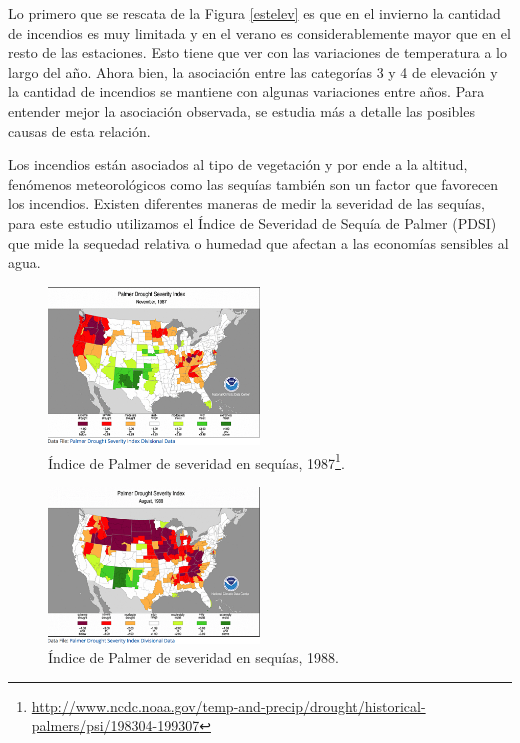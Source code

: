 \documentclass[12,]{article}
\let\rmarkdownfootnote\footnote%
\def\footnote{\protect\rmarkdownfootnote}
\begin{document}
Lo primero que se rescata de la Figura \ref{estelev} es que en el
invierno la cantidad de incendios es muy limitada y en el verano es
considerablemente mayor que en el resto de las estaciones. Esto tiene
que ver con las variaciones de temperatura a lo largo del año. Ahora
bien, la asociación entre las categorías 3 y 4 de elevación y la
cantidad de incendios se mantiene con algunas variaciones entre años.
Para entender mejor la asociación observada, se estudia más a detalle
las posibles causas de esta relación.

Los incendios están asociados al tipo de vegetación y por ende a la
altitud, fenómenos meteorológicos como las sequías también son un factor
que favorecen los incendios. Existen diferentes maneras de medir la
severidad de las sequías, para este estudio utilizamos el Índice de
Severidad de Sequía de Palmer (PDSI) que mide la sequedad relativa o
humedad que afectan a las economías sensibles al agua.

\begin{figure}[H]
\centering
\includegraphics[width=0.5\textwidth]{imagenes/IP87.png}
\caption{Índice de Palmer de severidad en sequías, 1987\footnote{\url{http://www.ncdc.noaa.gov/temp-and-precip/drought/historical-palmers/psi/198304-199307}}.}

\end{figure}

\begin{figure}[H]
\centering
\includegraphics[width=0.5\textwidth]{imagenes/IP88.png}
\caption{Índice de Palmer de severidad en sequías, 1988.}

\end{figure}
\end{document}
